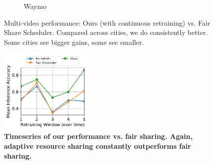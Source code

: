 \begin{figure}
\begin{subfigure}[t]{0.5\linewidth}
     \caption{Waymo}
    \label{fig:multicam-cities-waymo}
  \end{subfigure}
  \caption{Multi-video performance: Ours (with continuous retraining) vs. Fair Share Scheduler. Compared across cities, we do consistently better. Some cities see bigger gains, some see smaller.}
  \label{fig:multicam-cities}
\end{figure}


\begin{figure}
	\includegraphics[width=0.4\textwidth]{results/multicam/multicam_taskwise_acc_zurich_4_cityscapes.pdf}
	\caption{\bf Timeseries of our performance vs. fair sharing. Again, adaptive resource sharing constantly outperforms fair sharing. }
	\label{fig:multicam-timeseries}
\end{figure}


